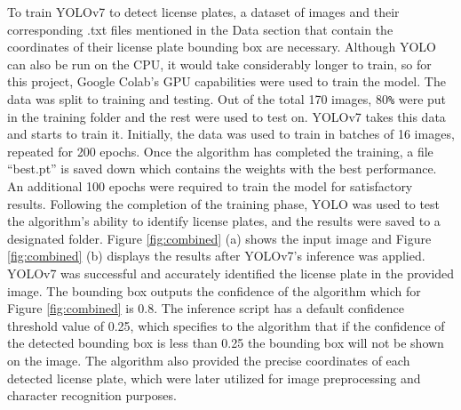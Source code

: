 \documentclass[conference]{IEEEtran}
\begin{document}
To train YOLOv7 to detect license plates, a dataset of images and their corresponding .txt files mentioned in the Data section that contain the coordinates of their license plate bounding box are necessary. Although YOLO can also be run on the CPU, it would take considerably longer to train, so for this project, Google Colab's GPU capabilities were used to train the model. The data was split to training and testing. Out of the total 170 images, 80\verb|%| were put in the training folder and the rest were used to test on. YOLOv7 takes this data and starts to train it. Initially, the data was used to train in batches of 16 images, repeated for 200 epochs. Once the algorithm has completed the training, a file “best.pt” is saved down which contains the weights with the best performance. An additional 100 epochs were required to train the model for satisfactory results. Following the completion of the training phase, YOLO was used to test the algorithm’s ability to identify license plates, and the results were saved to a designated folder. Figure \ref{fig:combined} (a) shows the input image and Figure \ref{fig:combined} (b) displays the results after YOLOv7’s inference was applied. YOLOv7 was successful and accurately identified the license plate in the provided image. The bounding box outputs the confidence of the algorithm which for Figure \ref{fig:combined} is 0.8. The inference script has a default confidence threshold value of 0.25, which specifies to the algorithm that if the confidence of the detected bounding box is less than 0.25 the bounding box will not be shown on the image. The algorithm also provided the precise coordinates of each detected license plate, which were later utilized for image preprocessing and character recognition purposes.
\end{document}
